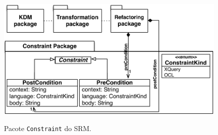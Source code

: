 \begin{figure}[h]
	\centering
		\caption{Pacote \texttt{Constraint} do SRM.}
	\includegraphics[scale=0.70]{images/pacoteConstraint3}
	\label{fig:pacote_constraint_srm}
	\fautor
\end{figure}

